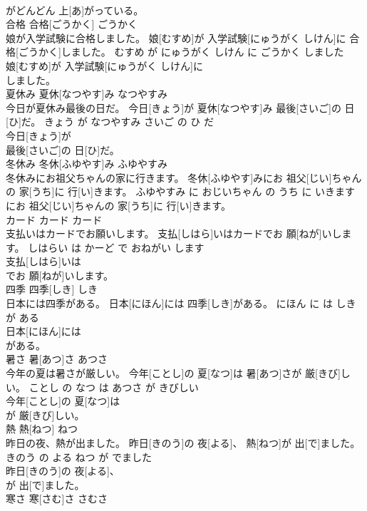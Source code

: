 \documentclass[8pt]{extreport}
\begin{document}
\begin{CJK}{UTF8}{min}
\\	がどんどん 上[あ]がっている。			
\\	合格	合格[ごうかく]	ごうかく	
\\	娘が入学試験に合格しました。	娘[むすめ]が 入学試験[にゅうがく しけん]に 合格[ごうかく]しました。	むすめ が にゅうがく しけん に ごうかく しました	
\\	娘[むすめ]が 入学試験[にゅうがく しけん]に
\\	しました。			
\\	夏休み	夏休[なつやす]み	なつやすみ	
\\	今日が夏休み最後の日だ。	今日[きょう]が 夏休[なつやす]み 最後[さいご]の 日[ひ]だ。	きょう が なつやすみ さいご の ひ だ	
\\	今日[きょう]が
\\	最後[さいご]の 日[ひ]だ。			
\\	冬休み	冬休[ふゆやす]み	ふゆやすみ	
\\	冬休みにお祖父ちゃんの家に行きます。	冬休[ふゆやす]みにお 祖父[じい]ちゃんの 家[うち]に 行[い]きます。	ふゆやすみ に おじいちゃん の うち に いきます	
\\	にお 祖父[じい]ちゃんの 家[うち]に 行[い]きます。			
\\	カード	カード	カード	
\\	支払いはカードでお願いします。	支払[しはら]いはカードでお 願[ねが]いします。	しはらい は かーど で おねがい します	
\\	支払[しはら]いは
\\	でお 願[ねが]いします。			
\\	四季	四季[しき]	しき	
\\	日本には四季がある。	日本[にほん]には 四季[しき]がある。	にほん に は しき が ある	
\\	日本[にほん]には
\\	がある。			
\\	暑さ	暑[あつ]さ	あつさ	
\\	今年の夏は暑さが厳しい。	今年[ことし]の 夏[なつ]は 暑[あつ]さが 厳[きび]しい。	ことし の なつ は あつさ が きびしい	
\\	今年[ことし]の 夏[なつ]は
\\	が 厳[きび]しい。			
\\	熱	熱[ねつ]	ねつ	
\\	昨日の夜、熱が出ました。	昨日[きのう]の 夜[よる]、 熱[ねつ]が 出[で]ました。	きのう の よる ねつ が でました	
\\	昨日[きのう]の 夜[よる]、
\\	が 出[で]ました。			
\\	寒さ	寒[さむ]さ	さむさ	

\end{CJK}
\end{document}
